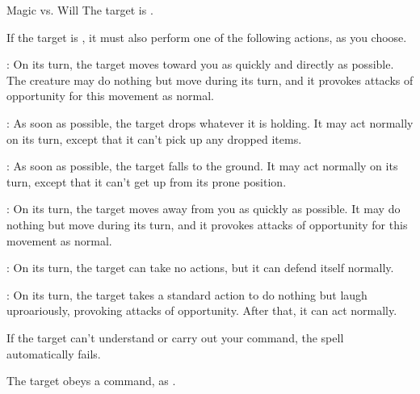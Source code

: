 \begin{spellheader}
    \spellrng{\rngmed}
\end{spellheader}
\begin{spelleffects}
    \begin{spellattack}{Magic vs. Will}
        \spellsuccess The target is \bewildered.

        If the target is \bloodied, it must also perform one of the following actions, as you choose.
        \par {}: On its turn, the target moves toward you as quickly and directly as possible. The creature may do nothing but move during its turn, and it provokes attacks of opportunity for this movement as normal.
        \par {}: As soon as possible, the target drops whatever it is holding. It may act normally on its turn, except that it can't pick up any dropped items.
        \par {}: As soon as possible, the target falls to the ground. It may act normally on its turn, except that it can't get up from its prone position.
        \par {}: On its turn, the target moves away from you as quickly as possible. It may do nothing but move during its turn, and it provokes attacks of opportunity for this movement as normal.
        \par {}: On its turn, the target can take no actions, but it can defend itself normally.
        \par {}: On its turn, the target takes a standard action to do nothing but laugh uproariously, provoking attacks of opportunity. After that, it can act normally.
    \end{spellattack}
\end{spelleffects}
\begin{spellfooter}
    \spellnotes If the target can't understand or carry out your command, the spell automatically fails.
\end{spellfooter}

\begin{spellheader}
    \spellrng{\rngmed}
\end{spellheader}
\begin{spelleffects}
    \spellsuccess The target obeys a command, as .
\end{spelleffects}
\begin{spellfooter}

\end{spellfooter}

